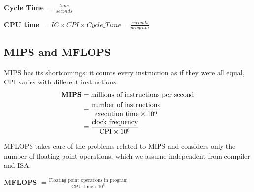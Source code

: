 \begin{center}
    \textbf{Cycle Time} \(=\frac{time}{seconds}\)
\end{center}

\begin{center}
    \textbf{CPU time} \(= IC \times CPI \times Cycle\_Time = \frac{seconds}{program}\)
\end{center}

\subsection{MIPS and MFLOPS}\label{subsec:mips-and-mflops}
MIPS has its shortcomings: it counts every instruction as if they were all equal, CPI varies with different
instructions.
\begin{align*}
    \text{\textbf{MIPS}} &= \text{millions of instructions per second}\\
                         &= \frac{\text{number of instructions}}{\text{execution time} \times 10^6}\\
                         &= \frac{\text{clock frequency}}{\text{CPI}\times 10^6}
\end{align*}

MFLOPS takes care of the problems related to MIPS and considers only the number of floating point operations, which we
assume
independent from compiler and ISA.

\begin{center}
    \textbf{MFLOPS} \(= \frac{\text{Floating point operations in program}}{\text{CPU time} \times 10^6}\)
\end{center}
